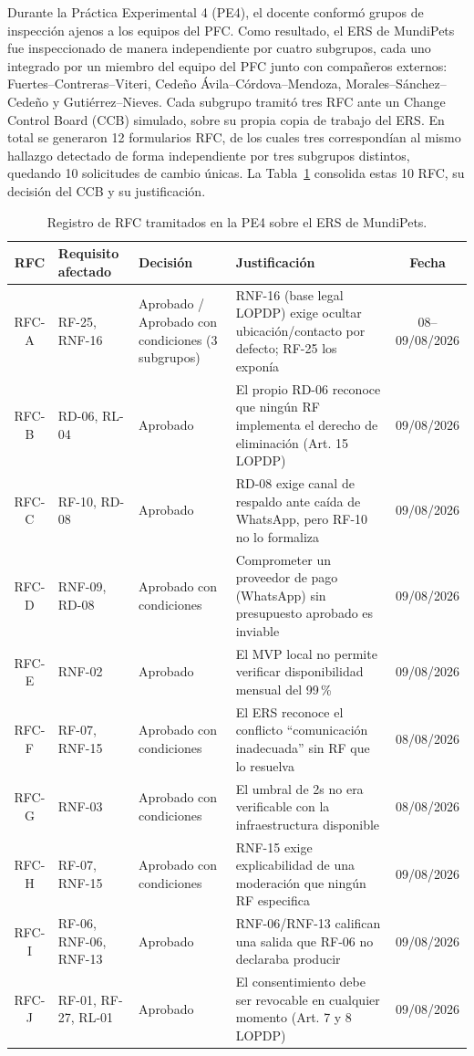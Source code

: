 \documentclass[journal,onecolumn]{IEEEtran}
\begin{document}
Durante la Práctica Experimental 4 (PE4), el docente conformó grupos de
inspección ajenos a los equipos del PFC. Como resultado, el ERS de
MundiPets fue inspeccionado de manera independiente por cuatro
subgrupos, cada uno integrado por un miembro del equipo del PFC junto
con compañeros externos: Fuertes--Contreras--Viteri, Cedeño
Ávila--Córdova--Mendoza, Morales--Sánchez--Cedeño y Gutiérrez--Nieves.
Cada subgrupo tramitó tres RFC ante un Change Control Board (CCB)
simulado, sobre su propia copia de trabajo del ERS. En total se
generaron 12 formularios RFC, de los cuales tres correspondían al mismo
hallazgo detectado de forma independiente por tres subgrupos distintos,
quedando 10 solicitudes de cambio únicas. La Tabla~\ref{tab:rfc_registro}
consolida estas 10 RFC, su decisión del CCB y su justificación.

\begin{table}[H]
	\centering
	\caption{Registro de RFC tramitados en la PE4 sobre el ERS de MundiPets.}
	\label{tab:rfc_registro}
	\small
	\begin{tabularx}{\textwidth}{|c|X|X|X|c|}
		\hline
		\textbf{RFC} & \textbf{Requisito afectado} & \textbf{Decisión} & \textbf{Justificación} & \textbf{Fecha} \\
		\hline
		RFC-A & RF-25, RNF-16 & Aprobado / Aprobado con condiciones (3 subgrupos) & RNF-16 (base legal LOPDP) exige ocultar ubicación/contacto por defecto; RF-25 los exponía & 08--09/08/2026 \\
		\hline
		RFC-B & RD-06, RL-04 & Aprobado & El propio RD-06 reconoce que ningún RF implementa el derecho de eliminación (Art. 15 LOPDP) & 09/08/2026 \\
		\hline
		RFC-C & RF-10, RD-08 & Aprobado & RD-08 exige canal de respaldo ante caída de WhatsApp, pero RF-10 no lo formaliza & 09/08/2026 \\
		\hline
		RFC-D & RNF-09, RD-08 & Aprobado con condiciones & Comprometer un proveedor de pago (WhatsApp) sin presupuesto aprobado es inviable & 09/08/2026 \\
		\hline
		RFC-E & RNF-02 & Aprobado & El MVP local no permite verificar disponibilidad mensual del 99\,\% & 09/08/2026 \\
		\hline
		RFC-F & RF-07, RNF-15 & Aprobado con condiciones & El ERS reconoce el conflicto ``comunicación inadecuada'' sin RF que lo resuelva & 08/08/2026 \\
		\hline
		RFC-G & RNF-03 & Aprobado con condiciones & El umbral de 2s no era verificable con la infraestructura disponible & 08/08/2026 \\
		\hline
		RFC-H & RF-07, RNF-15 & Aprobado con condiciones & RNF-15 exige explicabilidad de una moderación que ningún RF especifica & 09/08/2026 \\
		\hline
		RFC-I & RF-06, RNF-06, RNF-13 & Aprobado & RNF-06/RNF-13 califican una salida que RF-06 no declaraba producir & 09/08/2026 \\
		\hline
		RFC-J & RF-01, RF-27, RL-01 & Aprobado & El consentimiento debe ser revocable en cualquier momento (Art. 7 y 8 LOPDP) & 09/08/2026 \\
		\hline
	\end{tabularx}
\end{table}
\end{document}
